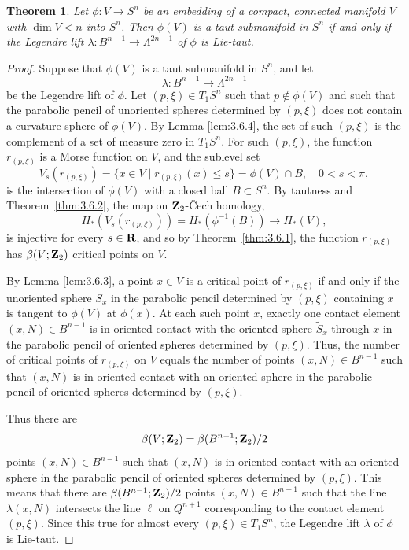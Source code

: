 \documentclass[12pt]{article}
\newtheorem{theorem}{Theorem}[section]
\begin{document}
\begin{theorem}
\label{thm:3.6.6} 
Let $\phi:V \rightarrow S^n$ be an embedding of a compact, connected manifold $V$ with $\dim V < n$ into $S^n$. Then
$\phi(V)$ is a taut submanifold in $S^n$ if and only if the Legendre lift $\lambda: B^{n-1} \rightarrow \Lambda^{2n-1}$
of $\phi$ is Lie-taut.
\end{theorem}
\begin{proof}
Suppose that $\phi(V)$ is a taut submanifold in $S^n$, and let 
\begin{displaymath}
\lambda: B^{n-1} \rightarrow \Lambda^{2n-1}
\end{displaymath}
be the Legendre lift of $\phi$.
Let $(p,\xi) \in T_1S^n$ such that $p \notin \phi(V)$
and such that the parabolic pencil of unoriented spheres 
determined by $(p,\xi)$ does not contain a curvature
sphere of $\phi(V)$.  By Lemma \ref{lem:3.6.4}, the set of such $(p,\xi)$ is the complement of a set of measure
zero in $T_1S^n$.  For such $(p,\xi)$, the function $r_{(p,\xi)}$ is a Morse function on $V$, and the sublevel set 
\begin{equation}
\label{eq:3.6.51}
V_s(r_{(p,\xi)}) = \{x \in V \mid r_{(p,\xi)}(x) \leq s\} = \phi(V) \cap B, \quad 0 < s < \pi,
\end{equation}
is the intersection of $\phi(V)$ with a closed ball $B \subset S^n$.  By tautness and Theorem~\ref{thm:3.6.2}, the map on 
${\bf Z}_2$-\v{C}ech homology,
\begin{equation}
\label{eq:3.6.52}
H_*(V_s(r_{(p,\xi)})) = H_*(\phi^{-1}(B)) \rightarrow H_*(V),
\end{equation}
is injective for every $s \in {\bf R}$, and so by Theorem~\ref{thm:3.6.1}, the function $r_{(p,\xi)}$ has
$\beta(V;{\bf Z}_2)$ critical points on $V$.  

By Lemma \ref{lem:3.6.3}, a point $x \in V$ is a critical point of $r_{(p,\xi)}$ if and only if
the unoriented sphere $S_x$ in the parabolic pencil determined
by $(p,\xi)$ containing $x$ is tangent to $\phi(V)$ at $\phi(x)$. At each such point $x$, exactly one contact
element $(x,N) \in B^{n-1}$ is in oriented contact with the oriented sphere $\widetilde{S}_x$ through $x$
in the parabolic pencil of oriented spheres determined by $(p,\xi)$.  Thus, the number of critical
points of $r_{(p,\xi)}$ on $V$ equals the number of points $(x,N) \in B^{n-1}$ such that $(x,N)$ is in oriented contact
with an oriented sphere in the parabolic pencil of oriented spheres
determined by $(p,\xi)$. 

Thus there are 
\begin{displaymath}
\beta(V;{\bf Z}_2) = \beta(B^{n-1};{\bf Z}_2)/2
\end{displaymath}
points $(x,N) \in B^{n-1}$ such that $(x,N)$ is in oriented contact
with an oriented sphere in the parabolic pencil of oriented spheres
determined by $(p,\xi)$.
This means that there
are $\beta(B^{n-1};{\bf Z}_2)/2$ points $(x,N) \in B^{n-1}$ such that the line $\lambda(x,N)$ 
intersects the line
$\ell$ on $Q^{n+1}$ corresponding to the contact element $(p,\xi)$.
Since this true for almost every $(p,\xi) \in T_1S^n$, the 
Legendre lift $\lambda$ of $\phi$ is Lie-taut.


\end{proof}
\end{document}
